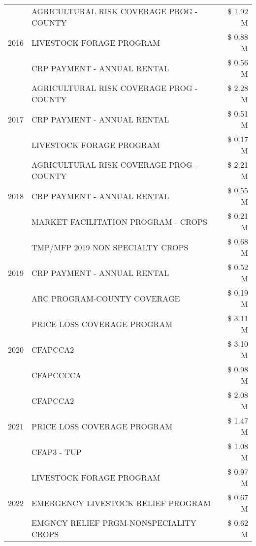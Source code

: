 \begin{tabular}{llr}
\cline{1-3}
\multirow[t]{3}{*}{2016} & AGRICULTURAL RISK COVERAGE PROG - COUNTY & \$ 1.92 M \\
 & LIVESTOCK FORAGE PROGRAM & \$ 0.88 M \\
 & CRP PAYMENT - ANNUAL RENTAL & \$ 0.56 M \\
\cline{1-3}
\multirow[t]{3}{*}{2017} & AGRICULTURAL RISK COVERAGE PROG - COUNTY & \$ 2.28 M \\
 & CRP PAYMENT - ANNUAL RENTAL & \$ 0.51 M \\
 & LIVESTOCK FORAGE PROGRAM & \$ 0.17 M \\
\cline{1-3}
\multirow[t]{3}{*}{2018} & AGRICULTURAL RISK COVERAGE PROG - COUNTY & \$ 2.21 M \\
 & CRP PAYMENT - ANNUAL RENTAL & \$ 0.55 M \\
 & MARKET FACILITATION PROGRAM - CROPS & \$ 0.21 M \\
\cline{1-3}
\multirow[t]{3}{*}{2019} & TMP/MFP 2019 NON SPECIALTY CROPS & \$ 0.68 M \\
 & CRP PAYMENT - ANNUAL RENTAL & \$ 0.52 M \\
 & ARC PROGRAM-COUNTY COVERAGE & \$ 0.19 M \\
\cline{1-3}
\multirow[t]{3}{*}{2020} & PRICE LOSS COVERAGE PROGRAM & \$ 3.11 M \\
 & CFAPCCA2 & \$ 3.10 M \\
 & CFAPCCCCA & \$ 0.98 M \\
\cline{1-3}
\multirow[t]{3}{*}{2021} & CFAPCCA2 & \$ 2.08 M \\
 & PRICE LOSS COVERAGE PROGRAM & \$ 1.47 M \\
 & CFAP3 - TUP & \$ 1.08 M \\
\cline{1-3}
\multirow[t]{3}{*}{2022} & LIVESTOCK FORAGE PROGRAM & \$ 0.97 M \\
 & EMERGENCY LIVESTOCK RELIEF PROGRAM & \$ 0.67 M \\
 & EMGNCY RELIEF PRGM-NONSPECIALITY CROPS & \$ 0.62 M \\
\cline{1-3}
\bottomrule
\end{tabular}
